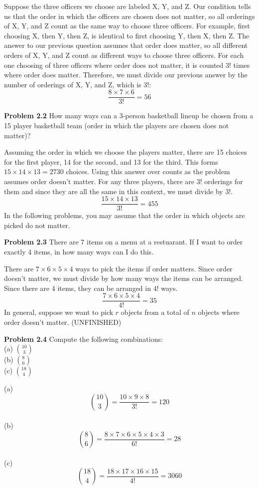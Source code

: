 \documentclass[11pt]{scrartcl}
\begin{document}
Suppose the three officers we choose are labeled X, Y, and Z. Our condition tells us that the order in which the officers are chosen does not matter, so all orderings of X, Y, and Z count as the same way to choose three officers. For example, first choosing X, then Y, then Z, is identical to first choosing Y, then X, then Z. The answer to our previous question assumes that order does matter, so all different orders of X, Y, and Z count as different ways to choose three officers. For each one choosing of three officers where order does not matter, it is counted $3!$ times where order does matter. Therefore, we must divide our previous answer by the number of orderings of X, Y, and Z, which is $3!$:
$$\frac{8\times7\times6}{3!}=56$$
\begin{tcolorbox}
\textbf{Problem 2.2} How many ways can a 3-person basketball lineup be chosen from a 15 player basketball team (order in which the players are chosen does not matter)?
\end{tcolorbox}
\noindent 
Assuming the order in which we choose the players matter, there are 15 choices for the first player, 14 for the second, and 13 for the third. This forms $15 \times 14 \times 13=2730$ choices. Using this answer over counts as the problem assumes order doesn't matter. For any three players, there are $3!$ orderings for them and since they are all the same in this context, we must divide by $3!$. 
$$\frac{15 \times 14 \times 13}{3!}=455$$
In the following problems, you may assume that the order in which objects are picked do not matter. 
\begin{tcolorbox}
\textbf{Problem 2.3} There are 7 items on a menu at a restuarant. If I want to order exactly 4 items, in how many ways can I do this. 
\end{tcolorbox}
\noindent 
There are $7 \times 6 \times 5 \times 4$ ways to pick the items if order matters. Since order doesn't matter, we must divide by how many ways the items can be arranged. Since there are 4 items, they can be arranged in $4!$ ways. 
$$\frac{7 \times 6 \times 5 \times 4}{4!}=35$$
In general, suppose we want to pick $r$ objects from a total of $n$ objects where order doesn't matter. (UNFINISHED)


\begin{tcolorbox}
\textbf{Problem 2.4} Compute the following combinations:\\
(a) $10 \choose 3$\\
(b) $8 \choose 6$\\
(c) $18 \choose 4$
\end{tcolorbox}
\noindent
(a) $${10 \choose 3}={\frac{10 \times 9 \times 8}{3!}}=120$$\\
(b) $${8 \choose 6}={\frac{8 \times 7 \times 6 \times 5 \times 4 \times 3}{6!}}=28$$\\
(c) $${18 \choose 4}={\frac{18\times17\times16\times15}{4!}}=3060$$
\end{document}
